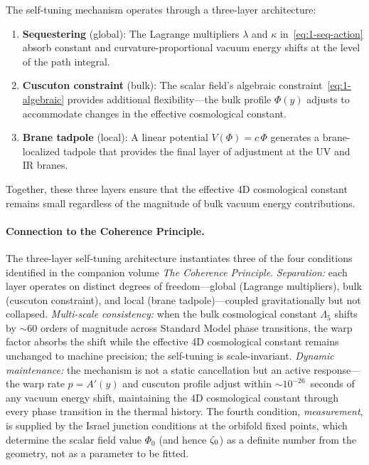The self-tuning mechanism operates through a three-layer architecture:
\begin{enumerate}
\item \textbf{Sequestering} (global): The Lagrange multipliers $\lambda$ and $\kappa$ in~\eqref{eq:1-seq-action} absorb constant and curvature-proportional vacuum energy shifts at the level of the path integral.

\item \textbf{Cuscuton constraint} (bulk): The scalar field's algebraic constraint~\eqref{eq:1-algebraic} provides additional flexibility---the bulk profile $\Phi(y)$ adjusts to accommodate changes in the effective cosmological constant.

\item \textbf{Brane tadpole} (local): A linear potential $V(\Phi) = c\,\Phi$ generates a brane-localized tadpole that provides the final layer of adjustment at the UV and IR branes.
\end{enumerate}

Together, these three layers ensure that the effective 4D cosmological constant remains small regardless of the magnitude of bulk vacuum energy contributions.

\paragraph{Connection to the Coherence Principle.}
The three-layer self-tuning architecture instantiates three of the four conditions identified in the companion volume \textit{The Coherence Principle}. \emph{Separation:} each layer operates on distinct degrees of freedom---global (Lagrange multipliers), bulk (cuscuton constraint), and local (brane tadpole)---coupled gravitationally but not collapsed. \emph{Multi-scale consistency:} when the bulk cosmological constant $\Lambda_5$ shifts by ${\sim}60$ orders of magnitude across Standard Model phase transitions, the warp factor absorbs the shift while the effective 4D cosmological constant remains unchanged to machine precision; the self-tuning is scale-invariant. \emph{Dynamic maintenance:} the mechanism is not a static cancellation but an active response---the warp rate $p = A'(y)$ and cuscuton profile adjust within ${\sim}10^{-26}$~seconds of any vacuum energy shift, maintaining the 4D cosmological constant through every phase transition in the thermal history. The fourth condition, \emph{measurement}, is supplied by the Israel junction conditions at the orbifold fixed points, which determine the scalar field value $\Phi_0$ (and hence $\zeta_0$) as a definite number from the geometry, not as a parameter to be fitted.

